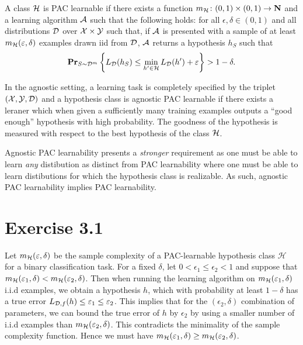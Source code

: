 \begin{definition}
A class $\mathcal{H}$ is PAC learnable if there exists a function $m_{\mathcal{H}}
\colon (0, 1) \times (0, 1) \rightarrow \mathbf{N}$ and a learning algorithm $\mathcal{A}$
such that the following holds: for all $\epsilon, \delta \in (0, 1)$ and all
distributions $\mathcal{D}$ over $\mathcal{X} \times \mathcal{Y}$ such that, if $\mathcal{A}$ is
presented with a sample of at least $m_{\mathcal{H}}(\varepsilon, \delta)$ examples
drawn iid from $\mathcal{D}$, $\mathcal{A}$ returns a hypothesis $h_S$ such that
\[
   \mathbf{Pr}_{S \sim \mathcal{D}^m} \left \{ L_{\mathcal{D}} (h_S) \leq
        \min_{h' \in \mathcal{H}} L_{\mathcal{D}} (h') + \varepsilon \right \} > 1 - \delta.
\]
\end{definition}
In the agnostic setting, a learning task is completely specified by the triplet
$(\mathcal{X}, \mathcal{Y}, \mathcal{D})$ and a hypothesis class is agnostic PAC learnable if
there exists a leraner which when given a sufficiently many training examples
outputs a ``good enough'' hypothesis with high probability. The goodness of the
hypothesis is measured with respect to the best hypothesis of the class $\mathcal{H}$.

Agnostic PAC learnability presents a \emph{stronger} requirement as one must
be able to learn \emph{any} distibution as distinct from PAC learnability where
one must be able to learn distibutions for which the hypothesis class is realizable.
As such, agnostic PAC learnability implies PAC learnability.

\section*{Exercise 3.1}

Let $m_{\mathcal{H}}(\varepsilon, \delta)$ be the sample complexity of a PAC-learnable
hypothesis class $\mathcal{H}$ for a binary classification task. For a fixed
$\delta$, let $0 < \epsilon_1 \leq \epsilon_2 < 1$ and suppose that
$m_{\mathcal{H}}(\varepsilon_1, \delta) < m_{\mathcal{H}}(\varepsilon_2, \delta)$. Then when
running the learning algorithm on $m_{\mathcal{H}}(\varepsilon_1, \delta)$ i.i.d
examples, we obtain a hypothesis $h$, which with probability at least $1 -
\delta$ has a true error $L_{\mathcal{D}, f}(h) \leq \varepsilon_1 \leq \varepsilon_2$. This
implies that for the $(\epsilon_2, \delta)$ combination of parameters, we can
bound the true error of $h$ by $\epsilon_2$ by using a smaller number of i.i.d
examples than $m_{\mathcal{H}}(\varepsilon_2, \delta)$. This contradicts the
minimality of the sample complexity function. Hence we must have
$m_{\mathcal{H}}(\varepsilon_1, \delta) \geq m_{\mathcal{H}}(\varepsilon_2, \delta)$.

